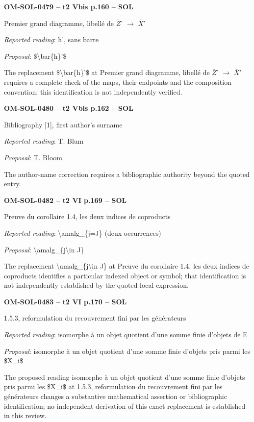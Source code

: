 \par\noindent\textbf{OM-SOL-0479 -- t2 Vbis p.160 -- SOL}\par
Premier grand diagramme, libellé de \ensuremath{\bar{Z}}' \ensuremath{\to} \ensuremath{\bar{X}}'\par
\emph{Reported reading}: h', sans barre\par
\emph{Proposal}: \$\textbackslash{}bar\{h\}'\$\par
The replacement \$\textbackslash{}bar\{h\}'\$ at Premier grand diagramme, libellé de \ensuremath{\bar{Z}}' \ensuremath{\to} \ensuremath{\bar{X}}' requires a complete check of the maps, their endpoints and the composition convention; this identification is not independently verified.\par
\par\noindent\textbf{OM-SOL-0480 -- t2 Vbis p.162 -- SOL}\par
Bibliography [1], first author's surname\par
\emph{Reported reading}: T. Blum\par
\emph{Proposal}: T. Bloom\par
The author-name correction requires a bibliographic authority beyond the quoted entry.\par
\par\noindent\textbf{OM-SOL-0482 -- t2 VI p.169 -- SOL}\par
Preuve du corollaire 1.4, les deux indices de coproducts\par
\emph{Reported reading}: \textbackslash{}amalg\_\{j=\allowbreak J\} (deux occurrences)\par
\emph{Proposal}: \textbackslash{}amalg\_\{j\textbackslash{}in J\}\par
The replacement \textbackslash{}amalg\_\{j\textbackslash{}in J\} at Preuve du corollaire 1.4, les deux indices de coproducts identifies a particular indexed object or symbol; that identification is not independently established by the quoted local expression.\par
\par\noindent\textbf{OM-SOL-0483 -- t2 VI p.170 -- SOL}\par
1.5.3, reformulation du recouvrement fini par les générateurs\par
\emph{Reported reading}: isomorphe à un objet quotient d'une somme finie d'objets de E\par
\emph{Proposal}: isomorphe à un objet quotient d'une somme finie d'objets pris parmi les \$X\_i\$\par
The proposed reading isomorphe à un objet quotient d'une somme finie d'objets pris parmi les \$X\_i\$ at 1.5.3, reformulation du recouvrement fini par les générateurs changes a substantive mathematical assertion or bibliographic identification; no independent derivation of this exact replacement is established in this review.\par
